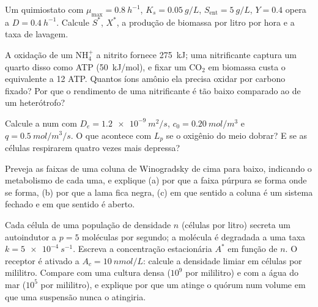 \begin{exercise}[$\star\star$]\label{exo:b2:microbial-metabolism:7}
Um quimiostato com $\mu_{\max} = \qty{0.8}{h^{-1}}$, $K_s =
\qty{0.05}{g/L}$, $S_{\text{ent}} = \qty{5}{g/L}$, $Y = 0.4$ opera a
$D = \qty{0.4}{h^{-1}}$. Calcule $S^*$, $X^*$, a produção de biomassa
por litro por hora e a taxa de lavagem.
\end{exercise}

\begin{exercise}[$\star\star$]\label{exo:b2:microbial-metabolism:8}
A oxidação de um $\mathrm{NH_4^+}$ a nitrito fornece \qty{275}{kJ};
uma nitrificante captura um quarto disso como ATP (\qty{50}{kJ/mol}),
e fixar um $\mathrm{CO_2}$ em biomassa custa o equivalente a 12
ATP. Quantos íons amônio ela precisa oxidar por carbono fixado? Por que
o rendimento de uma nitrificante é tão baixo comparado ao de um
heterótrofo?
\end{exercise}

\begin{exercise}[$\star\star$]\label{exo:b2:microbial-metabolism:9}
Calcule a  num  com
$D_e =
\qty{1.2e-9}{m^2/s}$, $c_0 = \qty{0.20}{mol/m^3}$ e $q =
\qty{0.5}{mol/m^3/s}$. O que acontece com $L_p$ se o oxigênio do meio
dobrar? E se as células respirarem quatro vezes mais depressa?
\end{exercise}

\begin{exercise}[$\star\star\star$]\label{exo:b2:microbial-metabolism:10}
Preveja as faixas de uma coluna de Winogradsky de cima para baixo,
indicando o metabolismo de cada uma, e explique (a) por que a faixa
púrpura se forma onde se forma, (b) por que a lama fica negra, (c) em
que sentido a coluna é um sistema fechado e em que sentido é aberto.
\end{exercise}

\begin{exercise}[$\star\star\star$]\label{exo:b2:microbial-metabolism:11}
Cada célula de uma população de densidade $n$ (células por litro)
secreta um autoindutor a $p = 5$ moléculas por segundo; a molécula é
degradada a uma taxa $k = \qty{5e-4}{s^{-1}}$. Escreva a concentração
estacionária $A^*$ em função de $n$. O receptor é ativado a
$A_c = \qty{10}{nmol/L}$: calcule a densidade limiar em células por
mililitro. Compare com uma cultura densa ($10^{9}$ por mililitro) e
com a água do mar ($10^{5}$ por mililitro), e explique por que um
 atinge o quórum num volume em que uma suspensão nunca o
atingiria.
\end{exercise}

